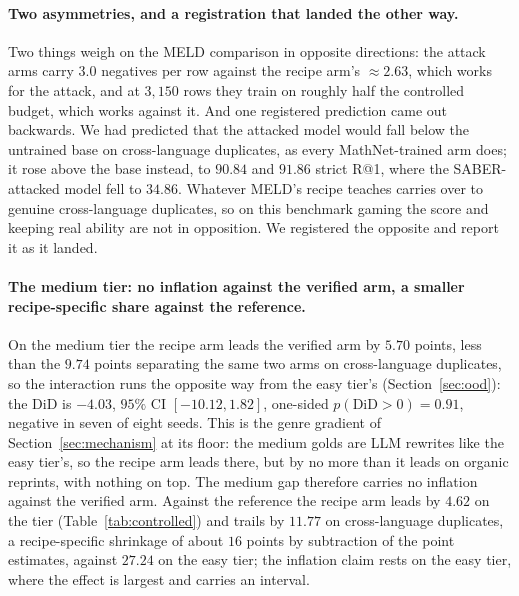 \paragraph{Two asymmetries, and a registration that landed the other way.}Two things weigh on the MELD comparison in opposite directions: the attack arms carry $3.0$ negatives per row against the recipe arm's ${\approx}2.63$, which works for the attack, and at $3{,}150$ rows they train on roughly half the controlled budget, which works against it. And one registered prediction came out backwards. We had predicted that the attacked model would fall below the untrained base on cross-language duplicates, as every MathNet-trained arm does; it rose above the base instead, to $90.84$ and $91.86$ strict R@1, where the SABER-attacked model fell to $34.86$. Whatever MELD's recipe teaches carries over to genuine cross-language duplicates, so on this benchmark gaming the score and keeping real ability are not in opposition. We registered the opposite and report it as it landed.

\paragraph{The medium tier: no inflation against the verified arm, a smaller recipe-specific share against the reference.}
On the medium tier the recipe arm leads the verified arm by $5.70$ points, less than the $9.74$ points separating the same two arms on cross-language duplicates, so the interaction runs the opposite way from the easy tier's (Section~\ref{sec:ood}): the DiD is $-4.03$, $95\%$ CI $[-10.12, 1.82]$, one-sided $p(\text{DiD} > 0) = 0.91$, negative in seven of eight seeds. This is the genre gradient of Section~\ref{sec:mechanism} at its floor: the medium golds are LLM rewrites like the easy tier's, so the recipe arm leads there, but by no more than it leads on organic reprints, with nothing on top. The medium gap therefore carries no inflation against the verified arm. Against the reference the recipe arm leads by $4.62$ on the tier (Table~\ref{tab:controlled}) and trails by $11.77$ on cross-language duplicates, a recipe-specific shrinkage of about $16$ points by subtraction of the point estimates, against $27.24$ on the easy tier; the inflation claim rests on the easy tier, where the effect is largest and carries an interval.


